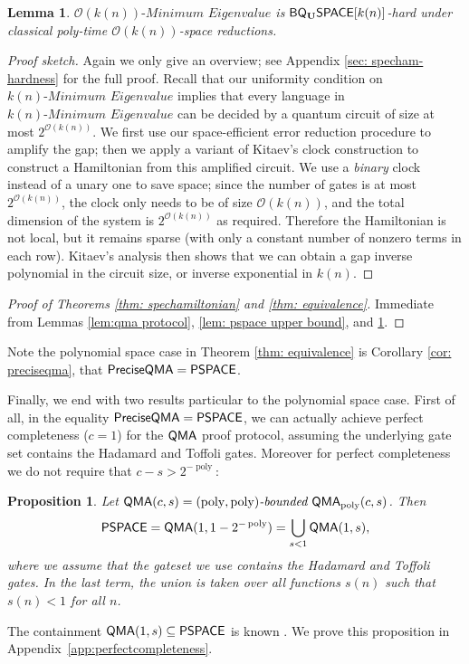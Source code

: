 \documentclass[11pt]{article}
\newtheorem{lemma}[theorem]{Lemma}
\newtheorem{proposition}[theorem]{Proposition}
\theoremstyle{definition}
\theoremstyle{remark}
\newcommand\QMA{{\sf{QMA}}}
\newcommand\PSPACE{{\sf{PSPACE}}}
\newcommand\preciseQMA{{\sf{PreciseQMA}}}
\newcommand\bddQMA[5]{{\left(#1,#2\right)}\textit{-bounded }\QMA_{#3}(#4,#5)}
\newcommand\spechamiltonian[1]{\ensuremath{#1}\textit{-Minimum Eigenvalue}}
\newcommand{\classfont}{\sf}
\newcommand{\Unitary}{\mathbf{U}}
\newcommand{\unitaryBQSPACE}[1]{{\classfont{BQ}_\Unitary\classfont{SPACE}}[#1]}
\newcommand\bigoh{\mathcal{O}}
\DeclareMathOperator{\poly}{poly}
\begin{document}
\begin{lemma}\label{lem: specham-hardness}
$\spechamiltonian{\bigoh(k(n))}$ is $\unitaryBQSPACE{k(n)}$-hard under classical poly-time $\bigoh(k(n))$-space reductions.
\end{lemma}

\begin{proof}[Proof sketch]
Again we only give an overview; see Appendix \ref{sec: specham-hardness} for the full proof. Recall that our uniformity condition on $\spechamiltonian{k(n)}$ implies that every language in $\spechamiltonian{k(n)}$ can be decided by a quantum circuit of size at most $2^{\bigoh(k(n))}$. We first use our space-efficient error reduction procedure to amplify the gap; then we apply a variant of Kitaev's clock construction \cite{ksv02} to construct a Hamiltonian from this amplified circuit. We use a \emph{binary} clock instead of a unary one to save space; since the number of gates is at most $2^{\bigoh(k(n))}$, the clock only needs to be of size $\bigoh(k(n))$, and the total dimension of the system is $2^{\bigoh(k(n))}$ as required. Therefore the Hamiltonian is not local, but it remains sparse (with only a constant number of nonzero terms in each row). Kitaev's analysis then shows that we can obtain a gap inverse polynomial in the circuit size, or inverse exponential in $k(n)$.
\end{proof}

\begin{proof}[Proof of Theorems \ref{thm: spechamiltonian} and \ref{thm: equivalence}]
Immediate from Lemmas \ref{lem:qma protocol}, \ref{lem: pspace upper bound}, and \ref{lem: specham-hardness}.
\end{proof}

Note the polynomial space case in Theorem \ref{thm: equivalence} is Corollary \ref{cor: preciseqma}, that $\preciseQMA=\PSPACE$.

Finally, we end with two results particular to the polynomial space case. First of all, in the equality $\preciseQMA=\PSPACE$, we can actually achieve perfect completeness ($c=1$) for the $\QMA$ proof protocol, assuming the underlying gate set contains the Hadamard and Toffoli gates. Moreover for perfect completeness we do not require that $c-s > 2^{-\poly}$:
\begin{proposition} \label{prop: perfect completeness} Let $\QMA(c,s) = \bddQMA{\poly}{\poly}{\poly}{c}{s}$. Then
\begin{equation}
\PSPACE = \QMA(1,1-2^{-\poly}) = \bigcup_{s < 1}\QMA(1,s), \nonumber
\end{equation}
where we assume that the gateset we use contains the Hadamard and Toffoli gates. In the last term, the union is taken over all functions $s(n)$ such that $s(n) < 1$ for all $n$.
\end{proposition}
The containment $\QMA(1,s) \subseteq \PSPACE$ is known \cite{ikw12}. We prove this proposition in Appendix~\ref{app:perfectcompleteness}.
\end{document}
